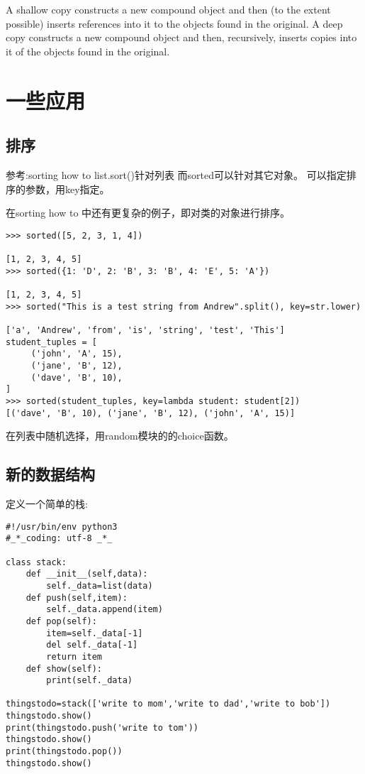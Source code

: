 \documentclass[twoside,11pt]{book}
\begin{document}
A shallow copy constructs a new compound object and then (to the extent possible) inserts references into it to the objects found in the original.
A deep copy constructs a new compound object and then, recursively, inserts copies into it of the objects found in the original.


\section{一些应用}
\subsection{排序}
参考:sorting how to
list.sort()针对列表
而sorted可以针对其它对象。
可以指定排序的参数，用key指定。

在sorting how to 中还有更复杂的例子，即对类的对象进行排序。

\begin{lstlisting}
>>> sorted([5, 2, 3, 1, 4])

[1, 2, 3, 4, 5]
>>> sorted({1: 'D', 2: 'B', 3: 'B', 4: 'E', 5: 'A'})

[1, 2, 3, 4, 5]
>>> sorted("This is a test string from Andrew".split(), key=str.lower)

['a', 'Andrew', 'from', 'is', 'string', 'test', 'This']
student_tuples = [
     ('john', 'A', 15),
     ('jane', 'B', 12),
     ('dave', 'B', 10),
]
>>> sorted(student_tuples, key=lambda student: student[2])
[('dave', 'B', 10), ('jane', 'B', 12), ('john', 'A', 15)]
\end{lstlisting}

在列表中随机选择，用random模块的的choice函数。

\subsection{新的数据结构}

定义一个简单的栈:
\begin{lstlisting}
#!/usr/bin/env python3
#_*_coding: utf-8 _*_

class stack:
    def __init__(self,data):
        self._data=list(data)
    def push(self,item):
        self._data.append(item)
    def pop(self):
        item=self._data[-1]
        del self._data[-1]
        return item
    def show(self):
        print(self._data)

thingstodo=stack(['write to mom','write to dad','write to bob'])
thingstodo.show()
print(thingstodo.push('write to tom'))
thingstodo.show()
print(thingstodo.pop())
thingstodo.show()
\end{lstlisting}
\end{document}
